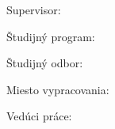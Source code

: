 


Supervisor: \mySupervisor

\medskip{}
\myDate


\newpage
\thispagestyle{empty}
\mbox{}
\newpage





Študijný program: \myStudyProgramSK

Študijný odbor: \myDegreeCourseSK

Miesto vypracovania: \myInstituteSK

Vedúci práce: \mySupervisor

\medskip{}

\myDateSK


\newpage
\thispagestyle{empty}
\mbox{}
\newpage

